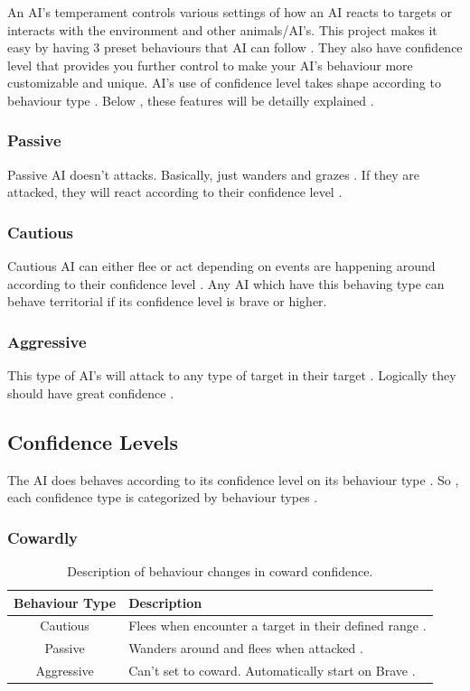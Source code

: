 An AI's temperament controls various settings of how an AI reacts to targets or interacts with the environment and other animals/AI's. This project makes it easy by having 3 preset behaviours that AI can follow . They also have confidence level that provides you further control to make your AI's behaviour more customizable and unique. AI's use of confidence level takes shape according to behaviour type .  Below , these features will be detailly explained .

\subsubsection{Passive}
Passive AI doesn't attacks. Basically, just wanders and grazes . If they are attacked, they will react according to their confidence level .

\subsubsection{Cautious}
Cautious AI can either flee or act depending on events are happening around according to their confidence level . Any AI which have this behaving type can behave territorial if its confidence level is brave or higher.

\subsubsection{Aggressive}

This type of AI's will attack to any type of target in their target . Logically they should have great confidence .


\subsection{Confidence Levels} \label{confidence_level}
The AI does behaves according to its confidence level on its behaviour type . So , each confidence type is categorized by behaviour types .

\subsubsection{Cowardly}

\begin{table}[ht]
    \centering
    \begin{tabular}{|c|L|}
         \hline 
         Behaviour Type   & Description  \\
         \hline
         Cautious    & Flees when encounter a target in their defined range . \\
         \hline
         Passive    & Wanders around and flees when attacked . \\
         \hline
         Aggressive & Can't set to coward. Automatically start on Brave . \\
         \hline 

    \end{tabular}
    \hfill
    \caption{ Description of behaviour changes in coward confidence. }
    \label{table:cowardly}
\end{table}


